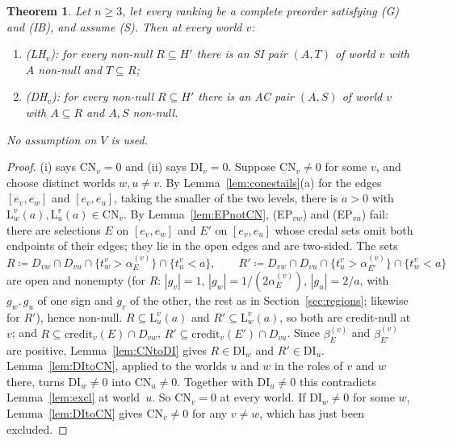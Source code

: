 \documentclass[11pt]{article}
\newtheorem{theorem}{Theorem}
\theoremstyle{definition}\newtheorem{definition}[theorem]{Definition}
\theoremstyle{remark}\newtheorem{remark}[theorem]{Remark}
\newcommand{\cred}{\mathrm{credit}}
\newcommand{\Lo}[3]{\mathrm L^{#1}_{#2}(#3)}
\newcommand{\CN}{\mathrm{CN}}
\newcommand{\DI}{\mathrm{DI}}
\begin{document}
\begin{theorem}\label{thm:LH}
Let $n\ge3$, let every ranking be a complete preorder satisfying (G) and
(IB), and assume (S). Then at every world $v$:
\begin{enumerate}[label=(\roman*),leftmargin=*,itemsep=2pt]
\item (LH$_v$): for every non-null $R\subseteq H'$ there is an SI pair
$(A,T)$ of world $v$ with $A$ non-null and $T\subseteq R$;
\item (DH$_v$): for every non-null $R\subseteq H'$ there is an AC pair
$(A,S)$ of world $v$ with $A\subseteq R$ and $A,S$ non-null.
\end{enumerate}
No assumption on $V$ is used.
\end{theorem}
\begin{proof}
(i) says $\CN_v=0$ and (ii) says $\DI_v=0$. Suppose $\CN_v\ne0$ for some
$v$, and choose distinct worlds $w,u\ne v$. By
Lemma~\ref{lem:conestails}(a) for the edges $[e_v,e_w]$ and $[e_v,e_u]$,
taking the smaller of the two levels, there is $a>0$ with $\Lo vwa,\Lo
vua\in\CN_v$. By Lemma~\ref{lem:EPnotCN}, (EP$_{vw}$) and (EP$_{vu}$) fail:
there are selections $E$ on $[e_v,e_w]$ and $E'$ on $[e_v,e_u]$ whose
credal sets omit both endpoints of their edges; they lie in the open edges
and are two-sided. The sets
\[
 R\coloneqq D_{vw}\cap D_{vu}\cap\{t^v_w>\alpha^{(v)}_E\}\cap\{t^v_u<a\},
 \qquad
 R'\coloneqq D_{vw}\cap D_{vu}\cap\{t^v_u>\alpha^{(v)}_{E'}\}\cap
 \{t^v_w<a\}
\]
are open and nonempty (for $R$: $|g_v|=1$, $|g_w|=1/(2\alpha^{(v)}_E)$,
$|g_u|=2/a$, with $g_w,g_u$ of one sign and $g_v$ of the other, the rest as
in Section~\ref{sec:regions}; likewise for $R'$), hence non-null. $R\subseteq\Lo vua$ and $R'\subseteq\Lo vwa$, so
both are credit-null at $v$; and $R\subseteq\cred_v(E)\cap D_{vw}$,
$R'\subseteq\cred_v(E')\cap D_{vu}$. Since $\beta^{(v)}_E$ and
$\beta^{(v)}_{E'}$ are positive, Lemma~\ref{lem:CNtoDI} gives $R\in\DI_w$
and $R'\in\DI_u$. Lemma~\ref{lem:DItoCN}, applied to the worlds $u$ and $w$
in the roles of $v$ and $w$ there, turns $\DI_w\ne0$ into $\CN_u\ne0$.
Together with $\DI_u\ne0$ this contradicts Lemma~\ref{lem:excl} at
world~$u$. So $\CN_v=0$ at every world. If $\DI_w\ne0$ for some $w$,
Lemma~\ref{lem:DItoCN} gives $\CN_v\ne0$ for any $v\ne w$, which has just
been excluded.
\end{proof}
\end{document}
